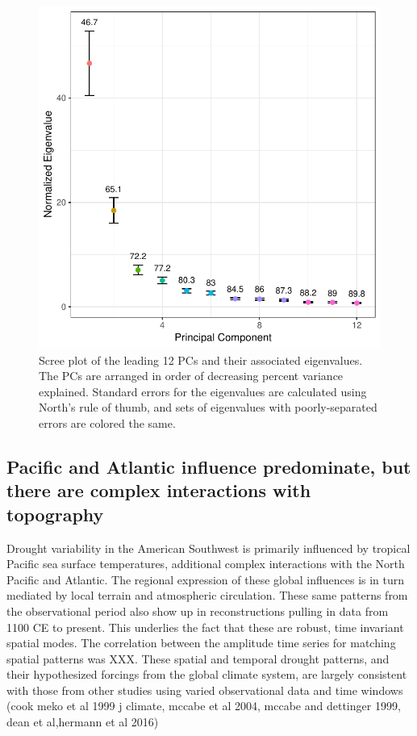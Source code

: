 \documentclass[fleqn,10pt]{wlscirep}
\begin{document}
\begin{figure}[!htbp]
\centering
\includegraphics[width=.5\linewidth]{figures/variance_explained.pdf}
\caption{Scree plot of the leading 12 PCs and their associated eigenvalues. The PCs are arranged in order of decreasing percent variance explained. Standard errors for the eigenvalues are calculated using North's rule of thumb, and sets of eigenvalues with poorly-separated errors are colored the same.}
\label{fig:reofs}
\end{figure}

\subsection*{Pacific and Atlantic influence predominate, but there are complex interactions with topography}

Drought variability in the American Southwest is primarily influenced by tropical Pacific sea surface temperatures, additional complex interactions with the North Pacific and Atlantic. The regional expression of these global influences is in turn mediated by local terrain and atmospheric circulation. These same patterns from the observational period also show up in reconstructions pulling in data from 1100 CE to present. This underlies the fact that these are robust, time invariant spatial modes. The correlation between the amplitude time series for matching spatial patterns was XXX. These spatial and temporal drought patterns, and their hypothesized forcings from the global climate system, are largely consistent with those from other studies using varied observational data and time windows (cook meko et al 1999 j climate, mccabe et al 2004, mccabe and dettinger 1999, dean et al,hermann et al 2016)
\end{document}
